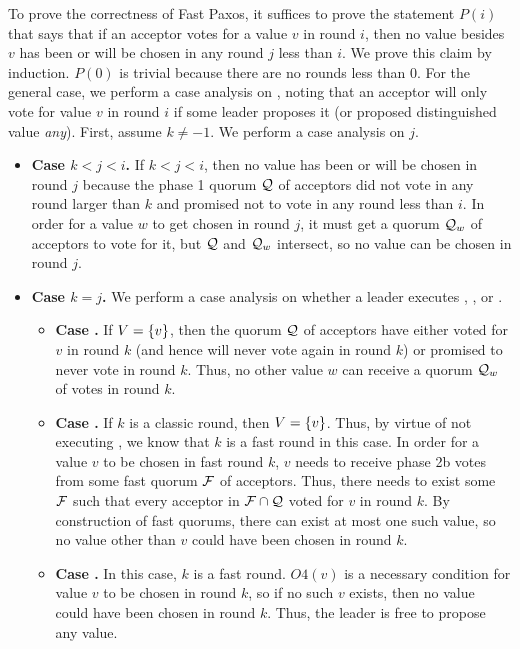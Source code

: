 To prove the correctness of Fast Paxos, it suffices to prove the statement
$P(i)$ that says that if an acceptor votes for a value $v$ in round $i$, then
no value besides $v$ has been or will be chosen in any round $j$ less than $i$.
We prove this claim by induction. $P(0)$ is trivial because there are no rounds
less than $0$. For the general case, we perform a case analysis on
, noting that an acceptor will only vote for value $v$ in
round $i$ if some leader proposes it (or proposed distinguished value
\emph{any}). First, assume $k \neq -1$. We perform a case analysis on $j$.
\begin{itemize}
  \item \textbf{Case $k < j < i$.}
    If $k < j < i$, then no value has been or will be chosen in round $j$
    because the phase 1 quorum $\mathcal{Q}$ of acceptors did not vote in any round
    larger than $k$ and promised not to vote in any round less than $i$. In
    order for a value $w$ to get chosen in round $j$, it must get a quorum
    $\mathcal{Q}_w$ of acceptors to vote for it, but $\mathcal{Q}$ and $\mathcal{Q}_w$
    intersect, so no value can be chosen in round $j$.

  \item \textbf{Case $k = j$.}
    We perform a case analysis on whether a leader executes
    , , or
    .
    \begin{itemize}
      \item \textbf{Case .}
        If $V = \{v\}$, then the quorum $\mathcal{Q}$ of acceptors have either
        voted for $v$ in round $k$ (and hence will never vote again in round
        $k$) or promised to never vote in round $k$. Thus, no other value $w$
        can receive a quorum $\mathcal{Q}_w$ of votes in round $k$.
      \item \textbf{Case .}
        If $k$ is a classic round, then $V = \{v\}$. Thus, by virtue of not
        executing , we know that $k$ is a fast
        round in this case. In order for a value $v$ to be chosen in fast round
        $k$, $v$ needs to receive phase 2b votes from some fast quorum
        $\mathcal{F}$ of acceptors. Thus, there needs to exist some
        $\mathcal{F}$ such that every acceptor in $\mathcal{F} \cap \mathcal{Q}$
        voted for $v$ in round $k$. By construction of fast quorums, there can
        exist at most one such value, so no value other than $v$ could have
        been chosen in round $k$.
      \item \textbf{Case .}
        In this case, $k$ is a fast round. $O4(v)$ is a necessary condition for
        value $v$ to be chosen in round $k$, so if no such $v$ exists, then no
        value could have been chosen in round $k$. Thus, the leader is free to
        propose any value.
    \end{itemize}


\end{itemize}
